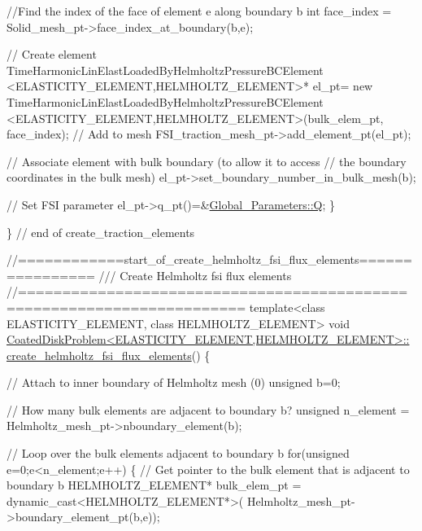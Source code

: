 \begin{DoxyCodeInclude}
{   \textcolor{comment}{//Find the index of the face of element e along boundary b}
   \textcolor{keywordtype}{int} face\_index = Solid\_mesh\_pt->face\_index\_at\_boundary(b,e);
   
   \textcolor{comment}{// Create element}
   TimeHarmonicLinElastLoadedByHelmholtzPressureBCElement
    <ELASTICITY\_ELEMENT,HELMHOLTZ\_ELEMENT>* el\_pt=
    \textcolor{keyword}{new} TimeHarmonicLinElastLoadedByHelmholtzPressureBCElement
    <ELASTICITY\_ELEMENT,HELMHOLTZ\_ELEMENT>(bulk\_elem\_pt,
                                           face\_index);   
   \textcolor{comment}{// Add to mesh}
   FSI\_traction\_mesh\_pt->add\_element\_pt(el\_pt);
   
   \textcolor{comment}{// Associate element with bulk boundary (to allow it to access}
   \textcolor{comment}{// the boundary coordinates in the bulk mesh)}
   el\_pt->set\_boundary\_number\_in\_bulk\_mesh(b); 
   
   \textcolor{comment}{// Set FSI parameter}
   el\_pt->q\_pt()=&\hyperlink{namespaceGlobal__Parameters_a7814fddf663e56168174a42d2cd6b4c1}{Global\_Parameters::Q};          
  \}
 
\} \textcolor{comment}{// end of create\_traction\_elements}





\textcolor{comment}{//============start\_of\_create\_helmholtz\_fsi\_flux\_elements================}\textcolor{comment}{}
\textcolor{comment}{/// Create Helmholtz fsi flux elements }
\textcolor{comment}{}\textcolor{comment}{//=======================================================================}
\textcolor{keyword}{template}<\textcolor{keyword}{class} ELASTICITY\_ELEMENT, \textcolor{keyword}{class} HELMHOLTZ\_ELEMENT>
\textcolor{keywordtype}{void} \hyperlink{classCoatedDiskProblem_a34f61c03b152f2ac06e1e771b0dbe09b}{CoatedDiskProblem<ELASTICITY\_ELEMENT,HELMHOLTZ\_ELEMENT>::}
\hyperlink{classCoatedDiskProblem_a34f61c03b152f2ac06e1e771b0dbe09b}{create\_helmholtz\_fsi\_flux\_elements}()
\{
 
 \textcolor{comment}{// Attach to inner boundary of Helmholtz mesh (0)}
 \textcolor{keywordtype}{unsigned} b=0;

 \textcolor{comment}{// How many bulk elements are adjacent to boundary b?}
 \textcolor{keywordtype}{unsigned} n\_element = Helmholtz\_mesh\_pt->nboundary\_element(b);
 
 \textcolor{comment}{// Loop over the bulk elements adjacent to boundary b}
 \textcolor{keywordflow}{for}(\textcolor{keywordtype}{unsigned} e=0;e<n\_element;e++)
  \{
   \textcolor{comment}{// Get pointer to the bulk element that is adjacent to boundary b}
   HELMHOLTZ\_ELEMENT* bulk\_elem\_pt = \textcolor{keyword}{dynamic\_cast<}HELMHOLTZ\_ELEMENT*\textcolor{keyword}{>}(
    Helmholtz\_mesh\_pt->boundary\_element\_pt(b,e));
   
}
\end{DoxyCodeInclude}
